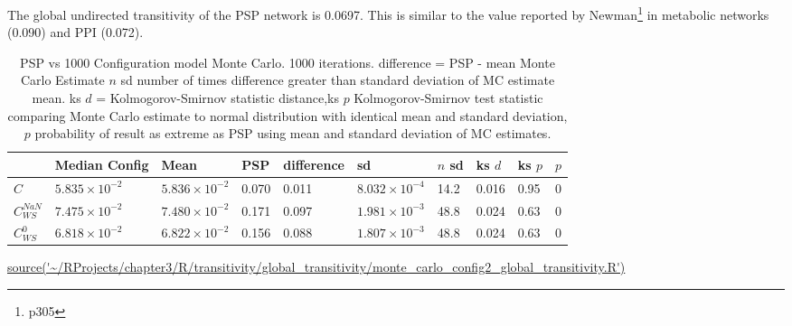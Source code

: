 The global undirected transitivity of the PSP network is 0.0697. This is similar to the value reported by Newman\footnote{p305} \cite{newman2018networks} in metabolic networks (0.090) and PPI (0.072).
\begin{table}[ht]
\centering
\begin{adjustbox}{width=\textwidth}


\begin{tabular}{llllllllll}
  \toprule
 & Median Config & Mean & PSP & difference & sd & $n$ sd & ks $d$ & ks $p$ & $p$ \\ 
  \midrule
$C$  & $5.835 \times 10^{-2}$ & $5.836 \times 10^{-2}$ & 0.070 & 0.011 & $8.032 \times 10^{-4}$ & 14.2 & 0.016 & 0.95 & 0 \\ 
   $C_{WS}^{NaN}$  & $7.475 \times 10^{-2}$ & $7.480 \times 10^{-2}$ & 0.171 & 0.097 & $1.981 \times 10^{-3}$ & 48.8 & 0.024 & 0.63 & 0 \\ 
   $C_{WS}^0$ & $6.818 \times 10^{-2}$ & $6.822 \times 10^{-2}$ & 0.156 & 0.088 & $1.807 \times 10^{-3}$ & 48.8 & 0.024 & 0.63 & 0 \\ 
   \bottomrule
\end{tabular}
\end{adjustbox}
\caption[Transitivity PSP compared with configuration model]{PSP vs 1000 Configuration model Monte Carlo. 1000 iterations. difference  = PSP - mean Monte Carlo Estimate $n$ sd number of times difference greater than standard deviation of MC estimate mean. ks $d$ = Kolmogorov-Smirnov statistic distance,ks $p$ Kolmogorov-Smirnov test statistic comparing Monte Carlo estimate to normal distribution with identical mean and standard deviation,  $p$ probability of result as extreme as PSP using mean and standard deviation of MC estimates. }
\tiny\url{source('~/RProjects/chapter3/R/transitivity/global_transitivity/monte_carlo_config2_global_transitivity.R')}
\label{tab: MC estimate of config transitivity}
\end{table}


\cite{newman2003social}
\cite{vasques2020transitivity}



